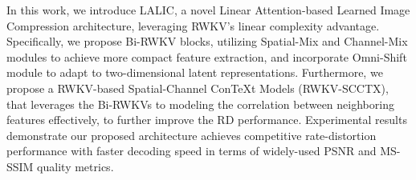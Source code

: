 


In this work, we introduce LALIC, a novel Linear Attention-based Learned Image Compression architecture, leveraging RWKV's linear complexity advantage. Specifically, we propose Bi-RWKV blocks, utilizing Spatial-Mix and Channel-Mix modules to achieve more compact feature extraction, and incorporate Omni-Shift\cite{Yang.2024.Restore-RWKV} module to adapt to two-dimensional latent representations. Furthermore, we propose a RWKV-based Spatial-Channel ConTeXt Models (RWKV-SCCTX), that leverages the Bi-RWKVs to modeling the correlation between neighboring features effectively, to further improve the RD performance.
%
Experimental results demonstrate our proposed architecture achieves competitive rate-distortion performance with faster decoding speed in terms of widely-used PSNR and MS-SSIM quality metrics. 

